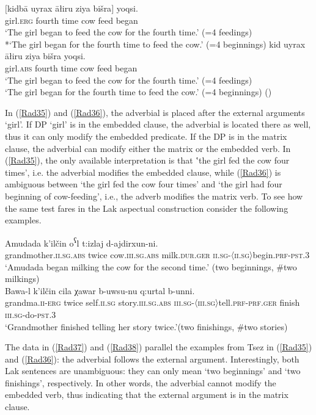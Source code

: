 \documentclass[output=paper]{langscibook}
\begin{document}
\ea\label{Rad35}
\gll $[$kidbā uyrax āłiru ziya bišra$]$ yoqsi.\\
 girl.\textsc{erg} fourth time cow feed began\\
\glt ‘The girl began to feed the cow for the fourth time.’ (=4 feedings)\\
*‘The girl began for the fourth time to feed the cow.’ (=4 beginnings)
\ex\label{Rad36}
\gll kid uyrax āłiru ziya bišra yoqsi.\\
girl.\textsc{abs} fourth time cow feed began\\
\glt ‘The girl began to feed the cow for the fourth time.’ (=4 feedings)\\
‘The girl began for the fourth time to feed the cow.’ (=4 beginnings) (\citealt[255]{PolinskyPotsdam2002})
\z 

In (\ref{Rad35}) and (\ref{Rad36}), the adverbial is placed after the external arguments ‘girl’. If DP ‘girl’ is in the embedded clause, the adverbial is located there as well, thus it can only modify the embedded predicate. If the DP is in the matrix clause, the adverbial can modify either the matrix or the embedded verb. In (\ref{Rad35}), the only available interpretation is that ‛the girl fed the cow four times’, i.e. the adverbial modifies the embedded clause, while (\ref{Rad36}) is ambiguous between ‘the girl fed the cow four times’ and ‘the girl had four beginning of cow-feeding’, i.e., the adverb modifies the matrix verb. To see how the same test fares in the Lak aspectual construction consider the following examples.

\ea\label{Rad37}
\gll Amudada k’ilčin o\textsuperscript{ʕ}l t:izlaj d-ajdirxun-ni.\\
grandmother.\textsc{ii.sg.abs} twice cow.\textsc{iii.sg.abs} milk.\textsc{dur.ger} \textsc{ii.sg-〈ii.sg〉}begin.\textsc{prf-pst.3}\\
\glt ‘Amudada began milking the cow for the second time.’ (two beginnings, \#two milkings)\\
\ex\label{Rad38}
\gll Bawa-l k’ilčin cila χawar b-uwsu-nu q:urtal b-unni.\\
grandma.\textsc{ii-erg} twice self.\textsc{ii.sg} story.\textsc{iii.sg.abs} \textsc{iii.sg-〈iii.sg〉}tell.\textsc{prf-prf.ger} finish 	\textsc{iii.sg}-do-\textsc{pst.3}\\
\glt ‘Grandmother finished telling her story twice.’(two finishings, \#two stories)\\
\z 

The data in (\ref{Rad37}) and (\ref{Rad38}) parallel the examples from Tsez in (\ref{Rad35}) and (\ref{Rad36}): the adverbial follows the external argument.  Interestingly, both Lak sentences are unambiguous: they can only mean ‘two beginnings’ and ‘two finishings’, respectively. In other words, the adverbial cannot modify the embedded verb, thus indicating that the external argument is in the matrix clause. 
\end{document}
